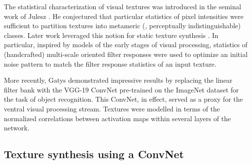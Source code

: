 The statistical characterization of visual textures was introduced
in the seminal work of Julesz \cite{julesz1962}.
He conjectured that particular statistics of pixel intensities
were sufficient to partition textures into metameric (\ie,
perceptually indistinguishable) classes. 
Later work leveraged this notion for static texture synthesis
\cite{heeger1995pyramid,portilla2000parametric}.
In particular, inspired by models of the early stages of visual 
processing, statistics of (handcrafted) multi-scale oriented filter 
responses were used to optimize an initial noise pattern 
to match the filter response statistics of an input texture.

More recently, Gatys \etal \cite{gatys2015} demonstrated
impressive results by replacing the linear filter bank with the VGG-19
\cite{simonyan2014very} ConvNet pre-trained on the ImageNet \cite{russakovsky2015} dataset for the task of object
recognition. This ConvNet, in effect, served as a proxy for the ventral visual
processing stream. 
Textures were modelled in terms of the normalized correlations between activation maps within several layers of the network.

\subsection{Texture synthesis using a ConvNet}

